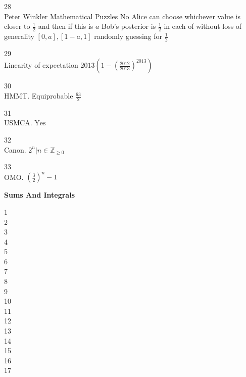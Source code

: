 28 \\
Peter Winkler Mathematical Puzzles $\boxed{\text{No}}$ Alice can choose whichever value is closer to $\frac{1}{2}$ and then if this is $a$ Bob's posterior is $\frac{1}{2}$ in each of without loss of generality $[0,a],[1-a,1]$ randomly guessing for $\frac{1}{2}$

29 \\
Linearity of expectation $\boxed{2013\left(1-\left(\frac{2012}{2013} \right)^{2013} \right)}$

30 \\
HMMT. Equiprobable $\boxed{\frac{63}{2}}$

31 \\
USMCA. $\boxed{\text{Yes}}$

32 \\
Canon. $\boxed{2^n|n \in \mathbb{Z}_{\ge 0}}$

33 \\
OMO. $\boxed{\left(\frac{3}{2} \right)^n-1}$

\newpage

\textbf{Sums And Integrals}

1 \\


2 \\


3 \\


4 \\


5 \\


6 \\


7 \\


8 \\


9 \\


10 \\


11 \\


12 \\


13 \\


14 \\


15 \\


16 \\


17 \\


